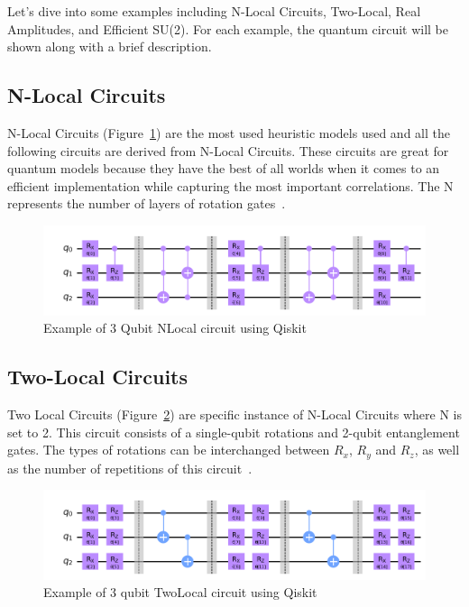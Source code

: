 \documentclass[11pt]{article}
\begin{document}
Let's dive into some examples including N-Local Circuits, Two-Local, Real Amplitudes, and Efficient SU(2). For each example, the quantum circuit will be shown along with a brief
description.

\subsection*{N-Local Circuits}

N-Local Circuits (Figure~\ref{fig:nlocal}) are the most used heuristic models used and all the following circuits are derived from N-Local Circuits.
These circuits are great for quantum models because they have the best of all worlds when it comes to an efficient implementation while capturing the most important
correlations. The N represents the number of layers of rotation gates~\cite{ibmansatz}.

\begin{figure}[!h]
    \centering
    \includegraphics[width=1\textwidth]{./figures/nlocal.png} 
    \caption{Example of 3 Qubit NLocal circuit using Qiskit}
    \label{fig:nlocal}
\end{figure}

\subsection*{Two-Local Circuits}

Two Local Circuits (Figure~\ref{fig:2local}) are specific instance of N-Local Circuits where N is set to 2. This circuit consists of a single-qubit rotations and 2-qubit entanglement gates.
The types of rotations can be interchanged between $R_x$, $R_y$ and $R_z$, as well as the number of repetitions of this circuit~\cite{ibmansatz}.

\begin{figure}[!h]
    \centering
    \includegraphics[width=1\textwidth]{./figures/2local.png} 
    \caption{Example of 3 qubit TwoLocal circuit using Qiskit}
    \label{fig:2local}
\end{figure}
\end{document}
